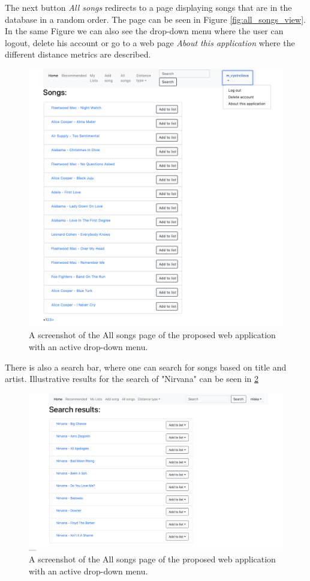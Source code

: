 The next button \textit{All songs} redirects to a page displaying songs that are in the database in a random order. The page can be seen in Figure \ref{fig:all_songs_view}. In the same Figure we can also see the drop-down menu where the user can logout, delete his account or go to a web page \textit{About this application} where the different distance metrics are described.
\begin{figure}[H]
    \centering
	\includegraphics[width=1\linewidth]{./img/all_songs_page.png}
	\caption{A screenshot of the All songs page of the proposed web application with an active drop-down menu.}
	\label{fig:all_songs_page}
\end{figure}
There is also a search bar, where one can search for songs based on title and artist. Illustrative results for the search of "Nirvana" can be seen in \ref{fig:search_results} \\
\begin{figure}[H]
    \centering
	\includegraphics[width=1\linewidth]{./img/search_results_page.png}
	\caption{A screenshot of the All songs page of the proposed web application with an active drop-down menu.}
	\label{fig:search_results}
\end{figure}
